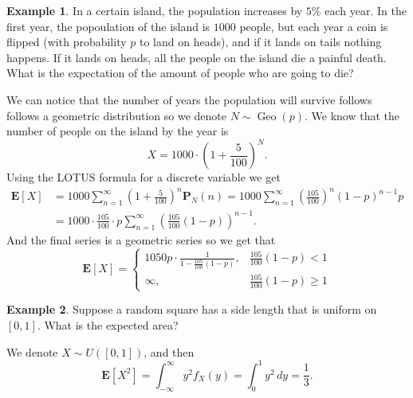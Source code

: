 \documentclass[11pt,a4paper]{article}
\theoremstyle{definition}
\newtheorem{example}{Example}[section]
\theoremstyle{plain}
\DeclareMathOperator{\Geo}{Geo}
\begin{document}
  \begin{example}
    In a certain island, the population increases by $5\%$ each year.
    In the first year, the popoulation of the island is $1000$ people,
    but each year a coin is flipped (with probability $p$ to land on heads),
    and if it lands on tails nothing happens. If it lands on heads, all
    the people on the island die a painful death. What is the expectation
    of the amount of people who are going to die?

    We can notice that the number of years the population will survive
    follows follows a geometric distribution so we denote $N \sim \Geo(p)$.
    We know that the number of people on the island by the year is
    \[
      X = 1000 \cdot \left(1 + \frac{5}{100}\right)^N.
    \]
    Using the LOTUS formula for a discrete variable we get
    \begin{align*}
      \mathbf E[X] &= 
      1000 \sum_{n=1}^{\infty} \left(1 + \frac{5}{100}\right)^n 
      \mathbf P_N(n) =
      1000 \sum_{n=1}^{\infty} \left(\frac{105}{100}\right)^n 
      (1 - p)^{n - 1} p \\ &=
      1000 \cdot \frac{105}{100} \cdot p 
      \sum_{n=1}^{\infty} \left(\frac{105}{100}(1-p)\right)^{n-1}.
    \end{align*}
    And the final series is a geometric series so we get that
    \[
      \mathbf E[X] =
      \begin{cases}
        1050 p \cdot \frac{1}{1 - \frac{105}{100}(1 - p)},
        &\frac{105}{100}(1-p) < 1 \\
        \infty,
        &\frac{105}{100}(1-p) \geq 1
      \end{cases}
    \]
  \end{example}

  \begin{example}
    Suppose a random square has a side length that is uniform on $[0,1]$.
    What is the expected area?

    We denote $X \sim U([0,1])$, and then
    \[
      \mathbf{E}[X^{2}] =
      \int_{-\infty}^{\infty} y^{2} f_{X}(y) =
      \int_{0}^{1}y^{2}\,dy =
      \frac{1}{3}.
    \]
  \end{example}
\end{document}
